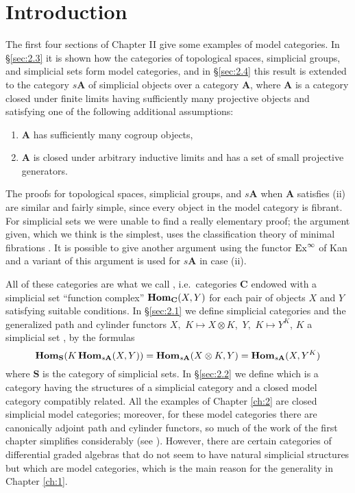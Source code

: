 \documentclass[../main]{subfiles}
\begin{document}
\section{Introduction}\label{sec:2.0}
The first four sections of Chapter II give some examples of model categories. In \S\ref{sec:2.3} it is shown how the categories of topological spaces, simplicial groups, and simplicial sets form model categories, and in \S\ref{sec:2.4} this result is extended to the category $s\mathbf A$ of simplicial objects over a category $\mathbf A$, where $\mathbf A$ is a category closed under finite limits having sufficiently many projective objects and satisfying one of the following additional assumptions: 
\begin{enumerate}[label = (\roman*)]
    \item $\mathbf A$ has sufficiently many cogroup objects,
    \item $\mathbf A$ is closed under arbitrary inductive limits and has a set of small projective generators. 
\end{enumerate}
The proofs for topological spaces, simplicial groups, and $s \mathbf A$ when $\mathbf A$ satisfies (ii) are similar and fairly simple, since every object in the model category is fibrant. For simplicial sets we were unable to find a really elementary proof; the argument given, which we think is the simplest, uses the classification theory of minimal fibrations \cite{barratt_semisimplicial_1959}. It is possible to give another argument using the functor $\operatorname{Ex}^\infty$ of Kan \cite{kan_css_1957}and a variant of this argument is used for $s\mathbf A$ in case (ii). 

All of these categories are what we call , i.e.\ categories $\mathbf C$ endowed with a simplicial set ``function complex'' $\operatorname{\mathbf{Hom}}_{\mathbf C}(X, Y)$ for each pair of objects $X$ and $Y$ satisfying suitable conditions. In \S\ref{sec:2.1} we define simplicial categories and the generalized path and cylinder functors $X,\,\,K \mapsto X \otimes K$, $\,Y,\,\,K \mapsto Y^K$, $K$ a simplicial set , by the formulas 
\[
\operatorname{\mathbf{Hom}}_{\mathbf S}(K \operatorname{\mathbf{Hom}}_{s\mathbf A}(X,Y))=\operatorname{\mathbf{Hom}}_{s\mathbf{A}}(X \otimes K, Y) = \operatorname{\mathbf{Hom}}_{s\mathbf A} (X, Y^K)
\]
where $\mathbf S$ is the category of simplicial sets. In \S\ref{sec:2.2} we define  which is a category having the structures of a simplicial category and a closed model category compatibly related. All the examples of Chapter \ref{ch:2} are closed simplicial model categories; moreover, for these model categories there are canonically adjoint path and cylinder functors, so much of the work of the first chapter simplifies considerably (see \cite{kan_css_1957-1}). However, there are certain categories of differential graded algebras that do not seem to have natural simplicial structures but which are model categories, which is the main reason for the generality in Chapter \ref{ch:1}.
\end{document}
